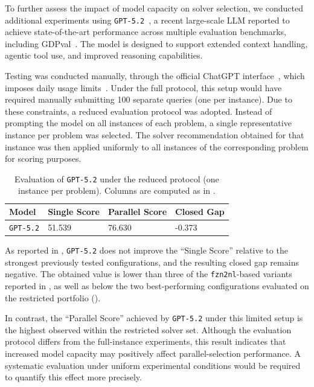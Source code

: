 \documentclass[../../main]{subfiles}
\begin{document}
To further assess the impact of model capacity on solver selection, we conducted additional experiments using \texttt{GPT-5.2}~\cite{gpt52}, a recent large-scale LLM reported to achieve state-of-the-art performance across multiple evaluation benchmarks, including GDPval~\cite{GDPval}. The model is designed to support extended context handling, agentic tool use, and improved reasoning capabilities.

Testing was conducted manually, through the official ChatGPT interface~\cite{chatGPT}, which imposes daily usage limits~\cite{gpt52Limits}. Under the full protocol, this setup would have required manually submitting 100 separate queries (one per instance). Due to these constraints, a reduced evaluation protocol was adopted. Instead of prompting the model on all instances of each problem, a single representative instance per problem was selected. The solver recommendation obtained for that instance was then applied uniformly to all instances of the corresponding problem for scoring purposes.

\begin{table}[ht]
    \centering
    \begin{tabular}{llll}
        \hline
            Model & Single Score & Parallel Score & Closed Gap \\ \hline
            \texttt{GPT-5.2} & 51.539 & 76.630 & -0.373 \\ \hline
        \end{tabular}
    \caption{Evaluation of \texttt{GPT-5.2} under the reduced protocol (one instance per problem). Columns are computed as in .}
    \label{tab:combinedgpt52}
\end{table}

As reported in , \texttt{GPT-5.2} does not improve the ``Single Score'' relative to the strongest previously tested configurations, and the resulting closed gap remains negative. The obtained value is lower than three of the \texttt{fzn2nl}-based variants reported in , as well as below the two best-performing configurations evaluated on the restricted portfolio ().

In contrast, the ``Parallel Score'' achieved by \texttt{GPT-5.2} under this limited setup is the highest observed within the restricted solver set. Although the evaluation protocol differs from the full-instance experiments, this result indicates that increased model capacity may positively affect parallel-selection performance. A systematic evaluation under uniform experimental conditions would be required to quantify this effect more precisely.
\end{document}

